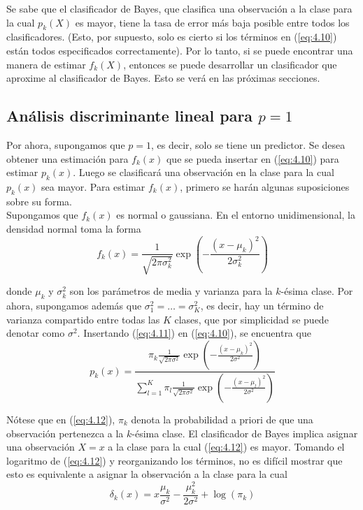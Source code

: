 Se sabe que el clasificador de Bayes, que clasifica una observación a la clase para la cual $p_k(X)$ es mayor, tiene la tasa de error más baja posible entre todos los clasificadores. (Esto, por supuesto, solo es cierto si los términos en (\ref{eq:4.10}) están todos especificados correctamente). Por lo tanto, si se puede encontrar una manera de estimar $f_k(X)$, entonces se puede desarrollar un clasificador que aproxime al clasificador de Bayes. Esto se verá en las próximas secciones.

\subsection{Análisis discriminante lineal para $p = 1$}

Por ahora, supongamos que $p = 1$, es decir, solo se tiene un predictor. Se desea obtener una estimación para $f_k(x)$ que se pueda insertar en (\ref{eq:4.10}) para estimar $p_k(x)$. Luego se clasificará una observación en la clase para la cual $p_k(x)$ sea mayor. Para estimar $f_k(x)$, primero se harán algunas suposiciones sobre su forma. \\

Supongamos que $f_k(x)$ es normal o gaussiana. En el entorno unidimensional, la densidad normal toma la forma
\begin{equation}
f_k(x) = \frac{1}{\sqrt{2\pi\sigma^2_k}} \exp\left(-\frac{(x - \mu_k)^2}{2\sigma^2_k}\right)
\label{eq:4.11}
\end{equation}

\noindent donde $\mu_k$ y $\sigma^2_k$ son los parámetros de media y varianza para la $k$-ésima clase. Por ahora, supongamos además que $\sigma^2_1 = \ldots = \sigma^2_K$, es decir, hay un término de varianza compartido entre todas las $K$ clases, que por simplicidad se puede denotar como $\sigma^2$. Insertando (\ref{eq:4.11}) en (\ref{eq:4.10}), se encuentra que
\begin{equation}
p_k(x) = \frac{\pi_k \frac{1}{\sqrt{2\pi\sigma^2}} \exp\left(-\frac{(x - \mu_k)^2}{2\sigma^2}\right)}{\sum_{l=1}^K \pi_l \frac{1}{\sqrt{2\pi\sigma^2}} \exp\left(-\frac{(x - \mu_l)^2}{2\sigma^2}\right)}
\label{eq:4.12}
\end{equation}

Nótese que en (\ref{eq:4.12}), $\pi_k$ denota la probabilidad a priori de que una observación pertenezca a la $k$-ésima clase. El clasificador de Bayes implica asignar una observación $X = x$ a la clase para la cual (\ref{eq:4.12}) es mayor. Tomando el logaritmo de (\ref{eq:4.12}) y reorganizando los términos, no es difícil mostrar que esto es equivalente a asignar la observación a la clase para la cual
\begin{equation}
\delta_k(x) = x \frac{\mu_k}{\sigma^2} - \frac{\mu_k^2}{2\sigma^2} + \log(\pi_k)
\label{eq:4.13}
\end{equation}

